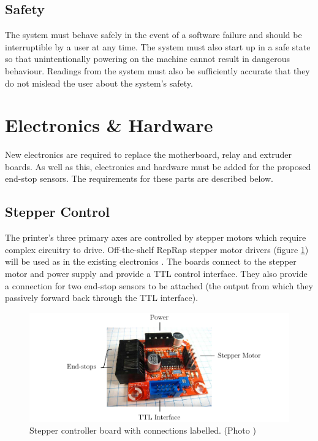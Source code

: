 		\subsection{Safety}
			
			The system must behave safely in the event of a software failure and
			should be interruptible by a user at any time. The system must also start
			up in a safe state so that unintentionally powering on the machine cannot
			result in dangerous behaviour. Readings from the system must also be
			sufficiently accurate that they do not mislead the user about the system's
			safety.
	
	\section{Electronics \& Hardware}
		
		New electronics are required to replace the motherboard, relay and extruder
		boards. As well as this, electronics and hardware must be added for the
		proposed end-stop sensors. The requirements for these parts are described
		below.
		
		\subsection{Stepper Control}
			
			The printer's three primary axes are controlled by stepper motors which
			require complex circuitry to drive. Off-the-shelf RepRap stepper motor
			drivers (figure \ref{fig:stepperControllerBoard}) will be used as in the
			existing electronics \cite{stepperMotorDriver23}. The boards connect to
			the stepper motor and power supply and provide a TTL control interface.
			They also provide a connection for two end-stop sensors to be attached
			(the output from which they passively forward back through the TTL
			interface).
			
			\begin{figure}
				\includegraphics[width=1\textwidth]{diagrams/stepperControllerBoard.pdf}
				\caption{Stepper controller board with connections labelled. (Photo \cite{stepperControllerBoardPhoto})}
				\label{fig:stepperControllerBoard}
			\end{figure}
			
